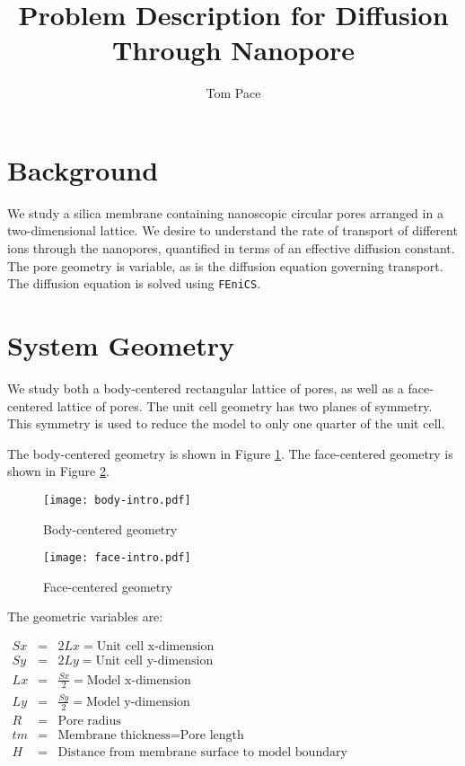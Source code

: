 \documentclass{article}
\begin{document}
\title{Problem Description for Diffusion Through Nanopore}
\author{Tom Pace}
\maketitle

\section{Background}\label{sec:background}

We study a silica membrane containing nanoscopic circular pores arranged in a two-dimensional lattice.
We desire to understand the rate of transport of different ions through the nanopores,
quantified in terms of an effective diffusion constant.
The pore geometry is variable, as is the diffusion equation governing transport.
The diffusion equation is solved using \texttt{FEniCS}.

\section{System Geometry}\label{sec:geometry}

We study both a body-centered rectangular lattice of pores,
as well as a face-centered lattice of pores.
The unit cell geometry has two planes of symmetry.
This symmetry is used to reduce the model to only one quarter of the unit cell.

The body-centered geometry is shown in Figure \ref{fig:body-intro}.
The face-centered geometry is shown in Figure \ref{fig:face-intro}.

\begin{figure}[H]
\centering
\texttt{[image: body-intro.pdf]}
\caption{Body-centered geometry}
\label{fig:body-intro}
\end{figure}

\begin{figure}[H]
\centering
\texttt{[image: face-intro.pdf]}
\caption{Face-centered geometry}
\label{fig:face-intro}
\end{figure}

The geometric variables are:

$\begin{array}{rcl}
Sx & = & 2 Lx =\text{Unit cell x-dimension} \\
Sy & = & 2 Ly =\text{Unit cell y-dimension} \\
Lx & = & \frac{Sx}{2} =\text{Model x-dimension} \\
Ly & = & \frac{Sy}{2} =\text{Model y-dimension} \\
R & = & \text{Pore radius} \\
tm & = & \text{Membrane thickness} = \text{Pore length} \\
H & = & \text{Distance from membrane surface to model boundary}
\end{array}$
\end{document}
